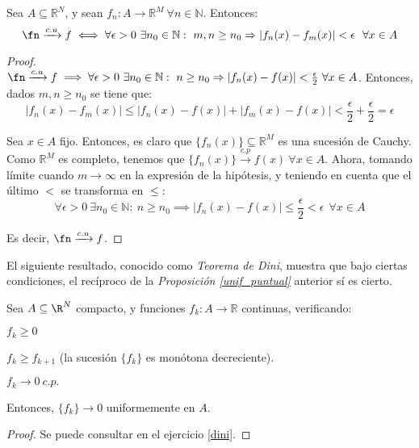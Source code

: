 \begin{nprop}
  Sea $A \subseteq \mathbb{R}^N$, y sean $f_n: A \longrightarrow \mathbb{R}^M \ \forall n \in \mathbb{N}$. Entonces: $$\fn \xrightarrow {c.u} f \iff \forall \epsilon > 0\ \exists n_0 \in \mathbb{N}:\ m,n \ge n_0 \Rightarrow |f_n(x) - f_m(x)| < \epsilon\ \ \forall x \in A$$
\end{nprop}

  \begin{proof} \hfill \\
    \boxed{\Rightarrow}	 $\fn \xrightarrow {c.u} f \implies \forall \epsilon > 0\ \exists n_0 \in \mathbb{N}:\ n \ge n_0 \Rightarrow |f_n(x) - f(x)| < \frac{\epsilon}{2}\ \forall x \in A$. Entonces, dados $m,n \ge n_0$ se tiene que:
    $$ |f_n(x) - f_m(x)| \le |f_n(x) - f(x)| + |f_m(x) - f(x)| < \frac{\epsilon}{2} + \frac{\epsilon}{2} = \epsilon$$

    \boxed{\Leftarrow} Sea $x \in A$ fijo. Entonces, es claro que $\{f_n(x)\} \subseteq \mathbb{R}^M$ es una sucesión de Cauchy. Como $\mathbb{R}^M$ es completo, tenemos que $\{f_n(x)\} \xrightarrow {c.p} f(x)\ \forall x \in A$. Ahora, tomando límite cuando $m \to \infty$ en la expresión de la hipótesis, y teniendo en cuenta que el último $<$ se transforma en $\le$: $$\forall \epsilon > 0\ \exists n_0 \in \mathbb{N}:\ n \ge n_0 \implies |f_n(x) - f(x)| \le \frac{\epsilon}{2} < \epsilon\ \ \forall x \in A$$

    Es decir, $\fn \xrightarrow {c.u} f$.
  \end{proof}

El siguiente resultado, conocido como \textit{Teorema de Dini}, muestra que bajo ciertas condiciones, el recíproco de la \textit{Proposición \ref{unif_puntual}} anterior sí es cierto.

\begin{nth}[de Dini]
  \label{1}
  Sea $A\subseteq \R^N$ compacto, y funciones $f_k : A \to \mathbb{R}$ continuas, verificando:

  \begin{nlist}
  \item $f_k \geq 0$
  \item $f_k \geq f_{k+1}$ (la sucesión $\{f_k\}$ es monótona decreciente).
  \item $f_k \to 0\ c.p.$
  \end{nlist}

  Entonces, $\{f_k\} \to 0$ uniformemente en $A$.
\end{nth}

  \begin{proof}
    Se puede consultar en el ejercicio \ref{dini}.
  \end{proof}

